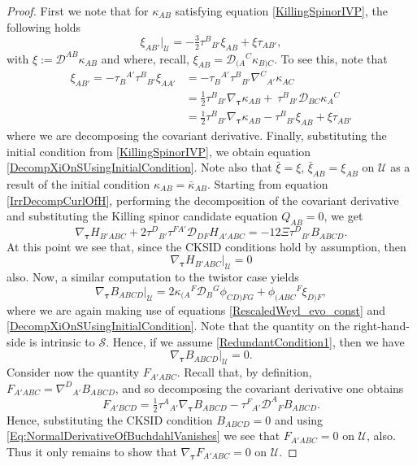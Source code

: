 \documentclass[10pt,a4paper]{article}
\theoremstyle{plain}
\begin{document}
\begin{proof}
  First we note that for $\kappa_{AB}$ satisfying equation
  \eqref{KillingSpinorIVP}, the following holds
\begin{equation}
\xi_{AB'}|_{\mathcal{U}} = -\tfrac{3}{2}
\tau^B{}_{B'}\xi_{AB} +
\xi\tau_{AB'}, \label{DecompXiOnSUsingInitialCondition}
\end{equation}
with $\xi:=\mathcal{D}^{AB}\kappa_{AB}$ and where, recall,
$\xi_{AB}=\mathcal{D}_{(A}{}^C\kappa_{B)C}$. To see this, note that
\begin{align}
\xi_{AB'} = - \tau_{B}{}^{A'} \tau^{B}{}_{B'}\xi_{AA'}
&= - \tau_{B}{}^{A'} \tau^{B}{}_{B'}\nabla^C{}_{A'}\kappa_{AC}\nonumber\\
&=\tfrac{1}{2}\tau^{B}{}_{B'}\nabla_{\bm\tau}\kappa_{AB} +
\ \tau^{B}{}_{B'}
\mathcal{D}_{BC}\kappa_{A}{}^{C} \nonumber\\ &=\tfrac{1}{2}\tau^{B}{}_{B'}\nabla_{\bm\tau}\kappa_{AB}
- \tau^B{}_{B'}\xi_{AB} + \xi\tau_{AB'}\label{AuxXiExpanded} 
\end{align}
where we are decomposing the covariant derivative. Finally,
substituting the initial condition from \eqref{KillingSpinorIVP}, we
obtain equation \eqref{DecompXiOnSUsingInitialCondition}. Note also
that $\bar{\xi}=\xi$, $\bar{\xi}_{AB} = \xi_{AB}$ on $\mathcal{U}$ as
a result of the initial condition $\kappa_{AB}=\bar{\kappa}_{AB}$.
Starting from equation \eqref{IrrDecompCurlOfH}, performing the
decomposition of the covariant derivative and substituting the Killing
spinor candidate equation $Q_{AB}=0$, we get
\[ \nabla_{\bm\tau} H_{B'ABC} + 2 \tau^{D}{}_{B'} \tau^{FA'}
\mathcal{D}_{DF}H_{A'ABC} = -12 \Xi \tau^{D}{}_{B'}B_{ABCD}.\]
At this point we see that, since the CKSID conditions hold by assumption, then
\[\nabla_{\bm\tau} H_{B'ABC}\big\vert_{\mathcal{U}}=0\] also. Now, a
similar computation to the twistor case yields
\begin{equation}
    \nabla_{\bm\tau} B_{ABCD}|_{\mathcal{U}} = 2
    \kappa_{(A}{}^{F}\mathcal{D}_{B}{}^{G}\phi_{CD)FG} +
    \phi_{(ABC}{}^{F}\xi_{D)F},\label{EvolutionForBuchdahl}
\end{equation}
where we are again making use of equations
\eqref{RescaledWeyl_evo_const} and
\eqref{DecompXiOnSUsingInitialCondition}.  Note that the quantity on
the right-hand-side is intrinsic to $\mathcal{S}$. Hence, if we assume
\eqref{RedundantCondition1}, then we have
\begin{equation}\label{Eq:NormalDerivativeOfBuchdahlVanishes}
    \nabla_{\bm\tau}B_{ABCD} |_{\mathcal{U}}= 0.
\end{equation}
Consider now the quantity $F_{A'ABC}$. Recall that, by definition,
$F_{A'ABC}=\nabla^D{}_{A'}B_{ABCD}$, and so decomposing the covariant
derivative one obtains
\[F_{A'BCD} = \tfrac{1}{2} \tau^{A}{}_{A'} \nabla_{\bm\tau} B_{ABCD}
- \tau^{F}{}_{A'} \mathcal{D}^{A}{}_{F}B_{ABCD}.\] Hence, substituting
the CKSID condition $B_{ABCD}=0$ and using
\eqref{Eq:NormalDerivativeOfBuchdahlVanishes} we see that
$F_{A'ABC}=0$ on $\mathcal{U}$, also.  Thus it only remains to show
that $\nabla_{\bm\tau}F_{A'ABC}=0$ on $\mathcal{U}$.


\end{proof}
\end{document}
